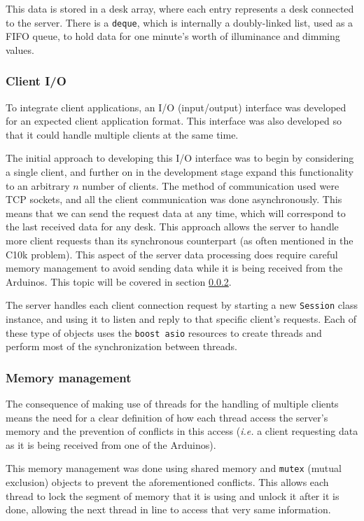 \documentclass[english,fira]{ist-report}
\begin{document}
This data is stored in a desk array, where each entry represents a desk connected to the server.
There is a \texttt{deque}, which is internally a doubly-linked list, used as a FIFO queue, to hold data for one minute's worth of illuminance and dimming values.

\subsubsection{Client I/O}

To integrate client applications, an I/O (input/output) interface was developed for an expected client application format. This interface was also developed so that it could handle multiple clients at the same time.

The initial approach to developing this I/O interface was to begin by considering a single client, and further on in the development stage expand this functionality to an arbitrary $n$ number of clients. The method of communication used were TCP sockets, and all the client communication was done asynchronously. This means that we can send the request data at any time, which will correspond to the last received data for any desk. This approach allows the server to handle more client requests than its synchronous counterpart (as often mentioned in the C10k problem).
This aspect of the server data processing does require careful memory management to avoid sending data while it is being received from the Arduinos. This topic will be covered in section \ref{sec:memorysync}.

The server handles each client connection request by starting a new \texttt{Session} class instance, and using it to listen and reply to that specific client's requests. Each of these type of objects uses the \texttt{boost asio} resources to create threads and perform most of the synchronization between threads.

\subsubsection{Memory management}\label{sec:memorysync}

The consequence of making use of threads for the handling of multiple clients means the need for a clear definition of how each thread access the server's memory and the prevention of conflicts in this access (\textit{i.e.\@} a client requesting data as it is being received from one of the Arduinos).

This memory management was done using shared memory and \texttt{mutex} (mutual exclusion) objects to prevent the aforementioned conflicts. This allows each thread to lock the segment of memory that it is using and unlock it after it is done, allowing the next thread in line to access that very same information.
\end{document}
